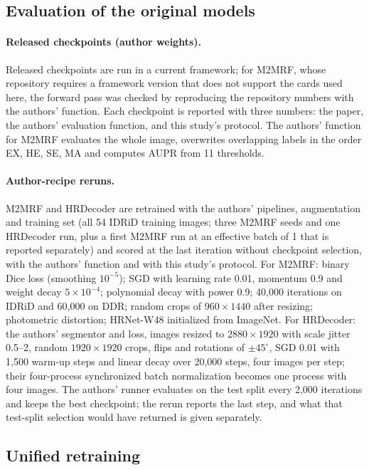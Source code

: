 \subsection{Evaluation of the original models}
\paragraph{Released checkpoints (author weights).} Released checkpoints are run in a current framework; for M2MRF, whose repository requires a framework version that does not support the cards used here, the forward pass was checked by reproducing the repository numbers with the authors' function. Each checkpoint is reported with three numbers: the paper, the authors' evaluation function, and this study's protocol. The authors' function for M2MRF evaluates the whole image, overwrites overlapping labels in the order EX, HE, SE, MA and computes AUPR from 11 thresholds.

\paragraph{Author-recipe reruns.} M2MRF and HRDecoder are retrained with the authors' pipelines, augmentation and training set (all 54 IDRiD training images; three M2MRF seeds and one HRDecoder run, plus a first M2MRF run at an effective batch of 1 that is reported separately) and scored at the last iteration without checkpoint selection, with the authors' function and with this study's protocol. For M2MRF: binary Dice loss (smoothing $10^{-5}$); SGD with learning rate 0.01, momentum 0.9 and weight decay $5\times10^{-4}$; polynomial decay with power 0.9; 40,000 iterations on IDRiD and 60,000 on DDR; random crops of $960\times1440$ after resizing; photometric distortion; HRNet-W48 initialized from ImageNet. For HRDecoder: the authors' segmentor and loss, images resized to $2880\times1920$ with scale jitter 0.5--2, random $1920\times1920$ crops, flips and rotations of $\pm45^\circ$, SGD 0.01 with 1,500 warm-up steps and linear decay over 20,000 steps, four images per step; their four-process synchronized batch normalization becomes one process with four images. The authors' runner evaluates on the test split every 2,000 iterations and keeps the best checkpoint; the rerun reports the last step, and what that test-split selection would have returned is given separately.

\subsection{Unified retraining}

